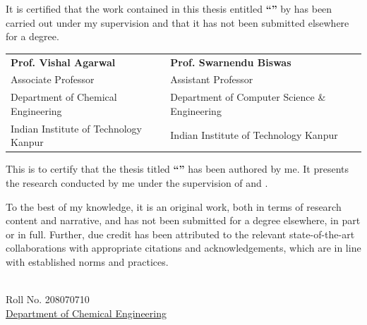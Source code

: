 \documentclass[11pt, a4paper, oneside]{Thesis} %
\begin{document}
\begin{minipage}{1.0\textwidth}
    
    It is certified that the work contained in this thesis entitled \textbf{\enquote{\ttitle}} by \textbf{\authornames} has been carried out under my supervision and that it has not been submitted elsewhere for a degree.
        
\end{minipage}

\vspace{45mm}

\begin{tabular}{@{}p{}@{}p{}@{}}
    \textbf{Prof. Vishal Agarwal} & \textbf{Prof. Swarnendu Biswas} \\
    Associate Professor & Assistant Professor \\
    Department of Chemical Engineering & Department of Computer Science \& Engineering \\
    Indian Institute of Technology Kanpur & Indian Institute of Technology Kanpur \\
\end{tabular}

\vfill
\clearpage %

This is to certify that the thesis titled \textbf{``\ttitle''} has been authored by me. It presents the research conducted by me under the supervision of \textbf{\supnameA} and \textbf{\supnameB}.\par

To the best of my knowledge, it is an original work, both in terms of research content and narrative, and has not been submitted for a degree elsewhere, in part or in full. Further, due credit has been attributed to the relevant state-of-the-art collaborations with appropriate citations and acknowledgements, which are in line with established norms and practices.\\ [2cm]
\begin{minipage}{.5\textwidth}
		\begin{flushleft}
			{\authornames\\ Roll No. 208070710 \\
			\normalsize{\href{http://www.iitk.ac.in/che}{Department of Chemical Engineering}\\
			\univname}}
		\end{flushleft}
\end{minipage}
\vfill
\end{document}
